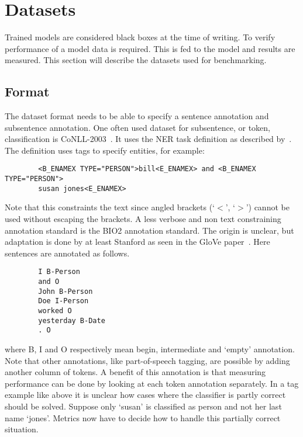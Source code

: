 \section{Datasets}
\label{sec:datasets}
Trained models are considered black boxes at the time of writing.
To verify performance of a model data is required.
This is fed to the model and results are measured.
This section will describe the datasets used for benchmarking.

\subsection{Format}
\label{subsec:format}
The dataset format needs to be able to specify a sentence annotation and subsentence annotation.
One often used dataset for subsentence, or token, classification is CoNLL-2003~\citep{tjong2003}.
It uses the NER task definition as described by~\citet{chinchor1999}.
The definition uses tags to specify entities, for example:
\begin{center}
    \begin{verbatim}
        <B_ENAMEX TYPE="PERSON">bill<E_ENAMEX> and <B_ENAMEX TYPE="PERSON">
        susan jones<E_ENAMEX>
    \end{verbatim}
\end{center}
Note that this constraints the text since angled brackets (`$<$', `$>$') cannot be used without escaping the brackets.
A less verbose and non text constraining annotation standard is the BIO2 annotation standard.
The origin is unclear, but adaptation is done by at least Stanford as seen in the GloVe paper~\citep{pennington2014}.
Here sentences are annotated as follows.
\begin{center}
    \begin{verbatim}
        I B-Person
        and O
        John B-Person
        Doe I-Person
        worked O
        yesterday B-Date
        . O
    \end{verbatim}
\end{center}
where B, I and O respectively mean begin, intermediate and `empty' annotation.
Note that other annotations, like part-of-speech tagging, are possible by adding another column of tokens.
A benefit of this annotation is that measuring performance can be done by looking at each token annotation separately.
In a tag example like above it is unclear how cases where the classifier is partly correct should be solved.
Suppose only `susan' is classified as person and not her last name `jones'.
Metrics now have to decide how to handle this partially correct situation.
